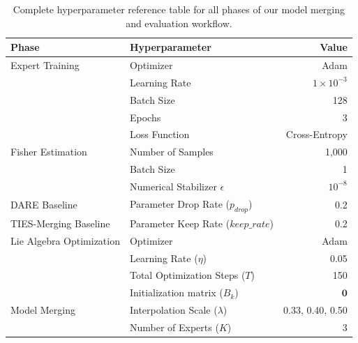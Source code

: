 \documentclass{article}
\theoremstyle{plain}
\theoremstyle{definition}
\theoremstyle{remark}
\begin{document}
\begin{table}[h]
\caption{Complete hyperparameter reference table for all phases of our model merging and evaluation workflow.}
\label{tab:hyperparameters}
\vskip 0.15in
\begin{center}
\begin{small}
\begin{sc}
\begin{tabular}{llr}
\toprule
Phase & Hyperparameter & Value \\
\midrule
Expert Training & Optimizer & Adam \\
& Learning Rate & $1 \times 10^{-3}$ \\
& Batch Size & 128 \\
& Epochs & 3 \\
& Loss Function & Cross-Entropy \\
\midrule
Fisher Estimation & Number of Samples & 1,000 \\
& Batch Size & 1 \\
& Numerical Stabilizer $\epsilon$ & $10^{-8}$ \\
\midrule
DARE Baseline & Parameter Drop Rate ($p_{drop}$) & 0.2 \\
TIES-Merging Baseline & Parameter Keep Rate ($keep\_rate$) & 0.2 \\
\midrule
Lie Algebra Optimization & Optimizer & Adam \\
& Learning Rate ($\eta$) & 0.05 \\
& Total Optimization Steps ($T$) & 150 \\
& Initialization matrix ($B_k$) & $\mathbf{0}$ \\
\midrule
Model Merging & Interpolation Scale ($\lambda$) & 0.33, 0.40, 0.50 \\
& Number of Experts ($K$) & 3 \\
\bottomrule
\end{tabular}
\end{sc}
\end{small}
\end{center}
\vskip -0.1in
\end{table}
\end{document}
